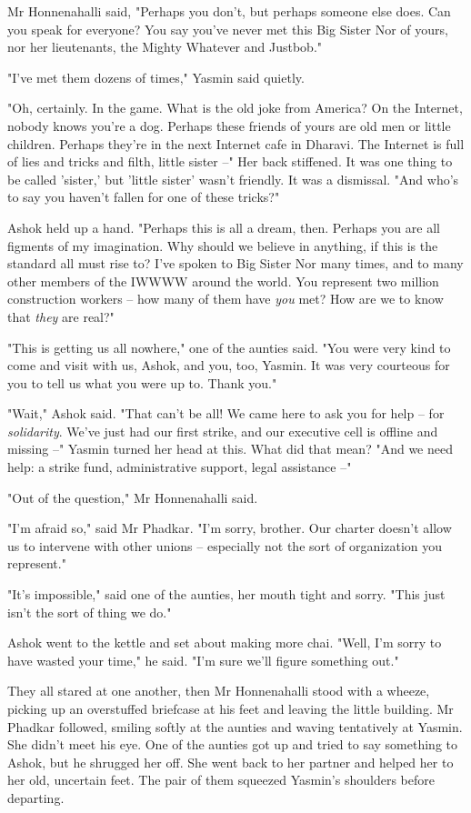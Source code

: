 Mr Honnenahalli said, "Perhaps you don't, but perhaps someone else
does. Can you speak for everyone? You say you've never met this Big
Sister Nor of yours, nor her lieutenants, the Mighty Whatever and
Justbob."

"I've met them dozens of times," Yasmin said quietly.

"Oh, certainly. In the game. What is the old joke from America? On
the Internet, nobody knows you're a dog. Perhaps these friends of
yours are old men or little children. Perhaps they're in the next
Internet cafe in Dharavi. The Internet is full of lies and tricks
and filth, little sister --" Her back stiffened. It was one thing
to be called 'sister,' but 'little sister' wasn't friendly. It was
a dismissal. "And who's to say you haven't fallen for one of these
tricks?"

Ashok held up a hand. "Perhaps this is all a dream, then. Perhaps
you are all figments of my imagination. Why should we believe in
anything, if this is the standard all must rise to? I've spoken to
Big Sister Nor many times, and to many other members of the IWWWW
around the world. You represent two million construction workers --
how many of them have \emph{you} met? How are we to know that
\emph{they} are real?"

"This is getting us all nowhere," one of the aunties said. "You
were very kind to come and visit with us, Ashok, and you, too,
Yasmin. It was very courteous for you to tell us what you were up
to. Thank you."

"Wait," Ashok said. "That can't be all! We came here to ask you for
help -- for \emph{solidarity}. We've just had our first strike, and
our executive cell is offline and missing --" Yasmin turned her
head at this. What did that mean? "And we need help: a strike fund,
administrative support, legal assistance --"

"Out of the question," Mr Honnenahalli said.

"I'm afraid so," said Mr Phadkar. "I'm sorry, brother. Our charter
doesn't allow us to intervene with other unions -- especially not
the sort of organization you represent."

"It's impossible," said one of the aunties, her mouth tight and
sorry. "This just isn't the sort of thing we do."

Ashok went to the kettle and set about making more chai. "Well, I'm
sorry to have wasted your time," he said. "I'm sure we'll figure
something out."

They all stared at one another, then Mr Honnenahalli stood with a
wheeze, picking up an overstuffed briefcase at his feet and leaving
the little building. Mr Phadkar followed, smiling softly at the
aunties and waving tentatively at Yasmin. She didn't meet his eye.
One of the aunties got up and tried to say something to Ashok, but
he shrugged her off. She went back to her partner and helped her to
her old, uncertain feet. The pair of them squeezed Yasmin's
shoulders before departing.

